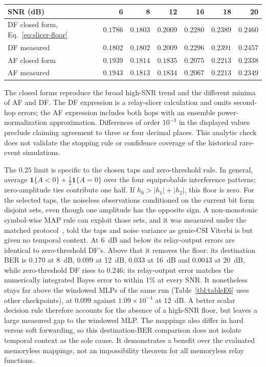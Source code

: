 \begin{center}\small
\begin{tabular}{lrrrrrr}
\toprule
SNR (dB) & 6 & 8 & 12 & 16 & 18 & 20 \\
\midrule
DF closed form, Eq.~\eqref{eq:slicer-floor} & $0.1786$ & $0.1803$ & $0.2009$ & $0.2280$ & $0.2389$ & $0.2460$ \\
DF measured & $0.1802$ & $0.1802$ & $0.2009$ & $0.2296$ & $0.2391$ & $0.2457$ \\
AF closed form & $0.1939$ & $0.1814$ & $0.1835$ & $0.2075$ & $0.2213$ & $0.2338$ \\
AF measured & $0.1943$ & $0.1813$ & $0.1834$ & $0.2067$ & $0.2213$ & $0.2349$ \\
\bottomrule
\end{tabular}
\end{center}

\noindent The closed forms reproduce the broad high-SNR trend and the different minima of AF and DF. The DF expression is a relay-slicer calculation and omits second-hop errors; the AF expression includes both hops with an ensemble power-normalization approximation. Differences of order $10^{-3}$ in the displayed values preclude claiming agreement to three or four decimal places. This analytic check does not validate the stopping rule or confidence coverage of the historical rare-event simulations.

The $0.25$ limit is specific to the chosen taps and zero-threshold rule. In general, average $\mathbf{1}\{A<0\}+\tfrac12\mathbf{1}\{A=0\}$ over the four equiprobable interference patterns; zero-amplitude ties contribute one half. If $h_0>|h_1|+|h_2|$, this floor is zero. For the selected taps, the noiseless observations conditioned on the current bit form disjoint sets, even though one amplitude has the opposite sign. A non-monotonic symbol-wise MAP rule can exploit those sets, and it was measured under the matched protocol~, told the taps and noise variance as genie-CSI Viterbi is but given no temporal context. At 6~dB and below its relay-output errors are identical to zero-threshold DF's. Above that it removes the floor: its destination BER is $0.170$ at 8~dB, $0.099$ at 12~dB, $0.033$ at 16~dB and $0.0043$ at 20~dB, while zero-threshold DF rises to $0.246$; its relay-output error matches the numerically integrated Bayes error to within 1\% at every SNR. It nonetheless stays far above the windowed MLPs of the same run (Table~\ref{tbl:tableE6} uses other checkpoints), at $0.099$ against $1.09\times10^{-4}$ at 12~dB. A better scalar decision rule therefore accounts for the absence of a high-SNR floor, but leaves a large measured gap to the windowed MLP. The mappings also differ in hard versus soft forwarding, so this destination-BER comparison does not isolate temporal context as the sole cause. It demonstrates a benefit over the evaluated memoryless mappings, not an impossibility theorem for all memoryless relay functions.

